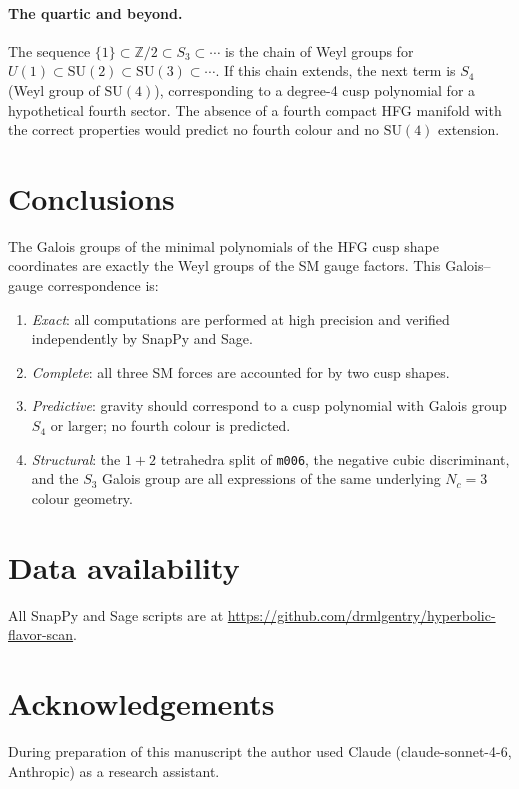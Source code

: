 \documentclass[11pt,a4paper]{article}
\theoremstyle{definition}
\theoremstyle{remark}
\newcommand{\mfld}[1]{\texttt{#1}}
\begin{document}
\paragraph{The quartic and beyond.}
The sequence $\{1\}\subset\mathbb{Z}/2\subset S_3\subset\cdots$
is the chain of Weyl groups for $U(1)\subset\mathrm{SU}(2)
\subset\mathrm{SU}(3)\subset\cdots$.
If this chain extends, the next term is $S_4$ (Weyl group of $\mathrm{SU}(4)$),
corresponding to a degree-4 cusp polynomial for a hypothetical fourth sector.
The absence of a fourth compact HFG manifold with the correct properties
would predict no fourth colour and no $\mathrm{SU}(4)$ extension.

\section{Conclusions}
\label{sec:concl}

The Galois groups of the minimal polynomials of the HFG cusp shape
coordinates are exactly the Weyl groups of the SM gauge factors.
This Galois--gauge correspondence is:
\begin{enumerate}
\item \emph{Exact}: all computations are performed at high precision
  and verified independently by SnapPy and Sage.
\item \emph{Complete}: all three SM forces are accounted for by
  two cusp shapes.
\item \emph{Predictive}: gravity should correspond to a cusp polynomial
  with Galois group $S_4$ or larger; no fourth colour is predicted.
\item \emph{Structural}: the $1+2$ tetrahedra split of \mfld{m006},
  the negative cubic discriminant, and the $S_3$ Galois group are
  all expressions of the same underlying $N_c=3$ colour geometry.
\end{enumerate}

\section*{Data availability}
All SnapPy and Sage scripts are at
\url{https://github.com/drmlgentry/hyperbolic-flavor-scan}.

\section*{Acknowledgements}
During preparation of this manuscript the author used
Claude (claude-sonnet-4-6, Anthropic) as a research assistant.
\end{document}
